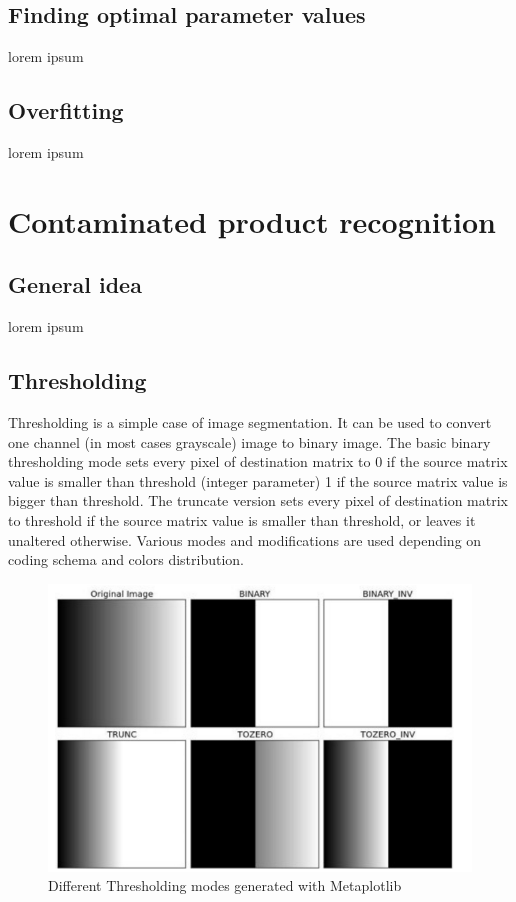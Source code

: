 \documentclass[12pt,twoside,a4paper]{article}
\begin{document}
\subsection{Finding optimal parameter values}
lorem ipsum
\subsection{Overfitting}
lorem ipsum
\section{Contaminated product recognition}
\subsection{General idea}
lorem ipsum
\subsection{Thresholding}

Thresholding is a simple case of image segmentation.
It can be used to convert one channel (in most cases grayscale) image to binary image.
The basic binary thresholding mode sets every pixel of destination matrix to
	0 if the source matrix value is smaller than threshold (integer parameter)
	1 if the source matrix value is bigger than threshold.
The truncate version sets every pixel of destination matrix to
	threshold if the source matrix value is smaller than threshold, or
	leaves it unaltered otherwise.
Various modes and modifications are used depending on coding schema and colors distribution.
  
\begin{figure}[H]
\centering
\includegraphics[width=0.4\paperwidth]{thr}
\caption{Different Thresholding modes generated with Metaplotlib}
\end{figure}
\end{document}
